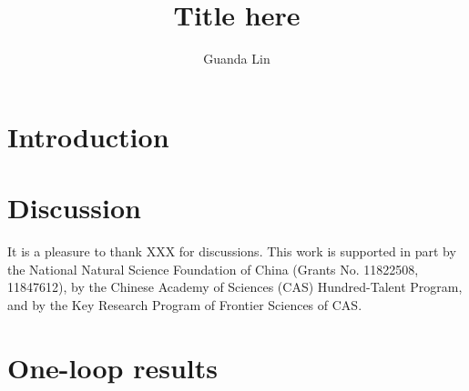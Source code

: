 \documentclass[11pt]{article}
\title{Title here}
\author[a]{Guanda Lin}
\affiliation[a]{School of Physics, PKU}
\begin{document}
\maketitle


\setcounter{footnote}{0}


\section{Introduction}






\section{Discussion}
\label{sec:discussion}



\acknowledgments

It is a pleasure to thank XXX for discussions. 
This work is supported in part by the National Natural Science Foundation of China (Grants No. 11822508, 11847612),
by the Chinese Academy of Sciences (CAS) Hundred-Talent Program, 
and by the Key Research Program of Frontier Sciences of CAS. 



\appendix


\section{One-loop results}
\label{app:oneloop}






\end{document}

